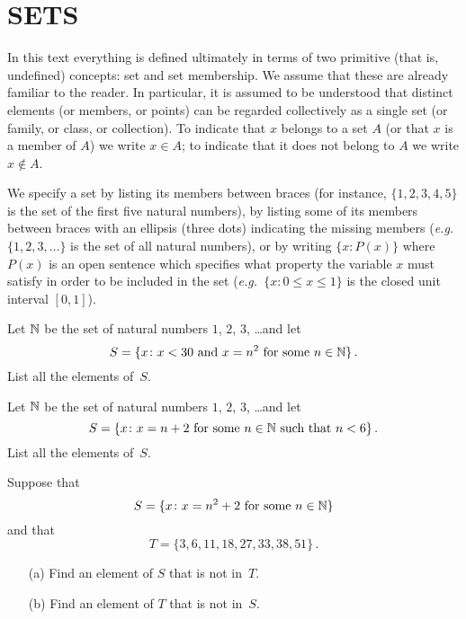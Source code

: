 \chapter{SETS}\label{sets}

 \setcounter{section}{1}
 \setcounter{thm}{0}

In this text everything is defined ultimately in terms of two primitive (that is, undefined)
concepts:
set and
set membership. We assume that these are already familiar to the reader.  In particular, it is
assumed to be understood that distinct
elements (or
members, or points) can be regarded collectively as a single set (or family, or class, or
collection). To indicate that $x$ belongs to a set $A$ (or that $x$ is a member of $A$) we
write $x \in A$; to indicate that it does not belong to $A$ we write $x \notin A$.

We specify a set by listing its members between braces  (for instance, $\{1, 2, 3, 4, 5\}$ is
the set of the first five natural numbers), by listing some of its members between braces with
an ellipsis (three dots) indicating the missing members (\emph{e.g.\ }$\{1, 2, 3, \dots\}$ is
the set of all natural numbers), or by writing $\{x\colon P(x)\}$ where $P(x)$ is an open
sentence which specifies what property the variable $x$ must satisfy in order to be included
in the set (\emph{e.g.\ }$\{x\colon 0 \le x \le 1\}$ is the closed unit interval $[0,1]$).

\begin{prob} Let $\mathbb{N}$ be the set of natural numbers $1$, $2$, $3$, \dots and let
   \[ S = \{x \colon x < 30 \text{ and $x = n^2$ for some $n \in \mathbb{N}$}\}\,. \]
List all the elements of~$S$.
\end{prob}

\begin{prob} Let $\mathbb{N}$ be the set of natural numbers $1$, $2$, $3$, \dots and let
  \[ S = \{x \colon x = n + 2 \text{ for some $n \in \mathbb{N}$ such that $n < 6$}\}\,. \]
List all the elements of~$S$.
\end{prob}

\begin{prob} Suppose that
  \[ S = \{x \colon x = n^2 + 2 \text{ for some $n \in \mathbb{N}$}\} \]
and that
  \[ T = \{3,6,11,18,27,33,38,51\}\,. \]
 \begin{enumerate}
  \item[(a)] Find an element of $S$ that is not in~$T$.
  \item[(b)] Find an element of $T$ that is not in~$S$.
 \end{enumerate}
\end{prob}

